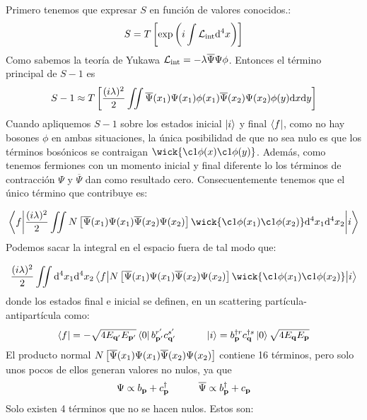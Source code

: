 \begin{solucion} 
	Primero tenemos que expresar $S$ en función de valores conocidos.: 
	\begin{equation}
		S = T\left[   \exp \left(  i \int \mathcal{L}_{\text{int}} \mathrm{d}^4 x  \right)  \right]
	\end{equation}
	Como sabemos la teoría de Yukawa $\mathcal{L}_{\text{int}}= -\lambda \overline{\Psi}\Psi \phi$.  Entonces el término principal de $S-1$ es
	\begin{equation*}
		S-1 \approx  T\left[  \frac{(i \lambda)^2}{2}\iint \overline{\Psi} (x_1) \Psi (x_1)  \phi (x_1)  \overline{\Psi} (x_2)\Psi (x_2) \phi (y)  \mathrm{d} x \mathrm{d} y  \right]
	\end{equation*}
	Cuando apliquemos $S-1$ sobre los estados inicial $\ket{i}$ y final $\bra{f}$, como no hay bosones $\phi$ en ambas situaciones, la única posibilidad de que no sea nulo es que los términos bosónicos se contraigan $\wick{\c1{\phi(x)}\c1{\phi(y)}}$. Además, como tenemos fermiones con un momento inicial y final diferente lo los términos de contracción $\Psi$ y $\overline{\Psi}$ dan como resultado cero. Consecuentemente tenemos que el único término que contribuye es:
	
	\begin{equation*}
		\mel**{f}{\frac{(i \lambda)^2}{2} \iint  N\ccorchetes{\aPsi (x_1)  \Psi (x_1) \aPsi(x_2)\Psi (x_2) } \wick{\c1{\phi}(x_1)\c1{\phi} (x_2)}  \D^4 x_1 \D^4 x_2 }{i}
	\end{equation*}
	Podemos sacar la integral en el espacio fuera de tal modo que: 
	
	\begin{equation*}
		\frac{(i \lambda)^2}{2} \iint  \D^4 x_1 \D^4 x_2  \mel**{f}{  N\ccorchetes{\aPsi (x_1)  \Psi (x_1) \aPsi(x_2)\Psi (x_2) } \wick{\c1{\phi}(x_1)\c1{\phi} (x_2)} }{i}
	\end{equation*}
	donde los estados final e inicial se definen, en un scattering partícula-antipartícula como:
	\begin{equation}
		\bra{f} = -\sqrt{4E_{\mathbf{q}'} E_{\mathbf{p}'}} \bra{0} b_{\mathbf{p}'}^{r'} c_{\mathbf{q}'}^{s'} \quad \quad \quad
		\ket{i} =   b_{\mathbf{p}}^{\dagger r} c_{\mathbf{q}}^{\dagger s}  \ket{0}\sqrt{4E_{\mathbf{q}} E_{\mathbf{p}}}
	\end{equation}
	El producto normal $N\left[ \overline{\Psi} (x_1) \Psi (x_1) \overline{\Psi} (x_2) \Psi (x_2)  \right]$ contiene 16 términos, pero solo unos pocos de ellos generan valores no nulos, ya que 
	\begin{equation*}
		\Psi \propto b_{\mathbf{p}} + c_{\mathbf{p}}^\dagger \quad \quad \quad 
		\overline{\Psi} \propto b_{\mathbf{p}}^\dagger + c_{\mathbf{p}} 
	\end{equation*}
	Solo existen 4 términos que no se hacen nulos. Estos son:
	

\end{solucion}
